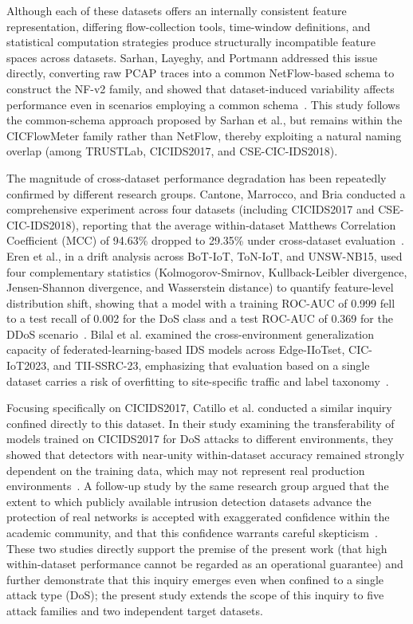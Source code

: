 \documentclass[a4paper,fleqn]{cas-sc}
\begin{document}
Although each of these datasets offers an internally consistent feature representation, differing flow-collection tools, time-window definitions, and statistical computation strategies produce structurally incompatible feature spaces across datasets. Sarhan, Layeghy, and Portmann addressed this issue directly, converting raw PCAP traces into a common NetFlow-based schema to construct the NF-v2 family, and showed that dataset-induced variability affects performance even in scenarios employing a common schema~\cite{Sarhan2022a,Sarhan2022b}. This study follows the common-schema approach proposed by Sarhan et al., but remains within the CICFlowMeter family rather than NetFlow, thereby exploiting a natural naming overlap (among TRUSTLab, CICIDS2017, and CSE-CIC-IDS2018).

The magnitude of cross-dataset performance degradation has been repeatedly confirmed by different research groups. Cantone, Marrocco, and Bria conducted a comprehensive experiment across four datasets (including CICIDS2017 and CSE-CIC-IDS2018), reporting that the average within-dataset Matthews Correlation Coefficient (MCC) of 94.63\% dropped to 29.35\% under cross-dataset evaluation~\cite{Cantone2024}. Eren et al., in a drift analysis across BoT-IoT, ToN-IoT, and UNSW-NB15, used four complementary statistics (Kolmogorov-Smirnov, Kullback-Leibler divergence, Jensen-Shannon divergence, and Wasserstein distance) to quantify feature-level distribution shift, showing that a model with a training ROC-AUC of 0.999 fell to a test recall of 0.002 for the DoS class and a test ROC-AUC of 0.369 for the DDoS scenario~\cite{Eren2026}. Bilal et al. examined the cross-environment generalization capacity of federated-learning-based IDS models across Edge-IIoTset, CIC-IoT2023, and TII-SSRC-23, emphasizing that evaluation based on a single dataset carries a risk of overfitting to site-specific traffic and label taxonomy~\cite{Bilal2026}.

Focusing specifically on CICIDS2017, Catillo et al. conducted a similar inquiry confined directly to this dataset. In their study examining the transferability of models trained on CICIDS2017 for DoS attacks to different environments, they showed that detectors with near-unity within-dataset accuracy remained strongly dependent on the training data, which may not represent real production environments~\cite{Catillo2022}. A follow-up study by the same research group argued that the extent to which publicly available intrusion detection datasets advance the protection of real networks is accepted with exaggerated confidence within the academic community, and that this confidence warrants careful skepticism~\cite{Catillo2023}. These two studies directly support the premise of the present work (that high within-dataset performance cannot be regarded as an operational guarantee) and further demonstrate that this inquiry emerges even when confined to a single attack type (DoS); the present study extends the scope of this inquiry to five attack families and two independent target datasets.
\end{document}
